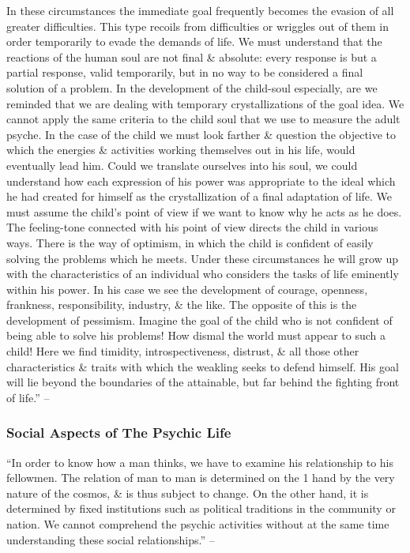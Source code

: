 \documentclass{article}
\begin{document}
In these circumstances the immediate goal frequently becomes the evasion of all greater difficulties. This type recoils from difficulties or wriggles out of them in order temporarily to evade the demands of life. We must understand that the reactions of the human soul are not final \& absolute: every response is but a partial response, valid temporarily, but in no way to be considered a final solution of a problem. In the development of the child-soul especially, are we reminded that we are dealing with temporary crystallizations of the goal idea. We cannot apply the same criteria to the child soul that we use to measure the adult psyche. In the case of the child we must look farther \& question the objective to which the energies \& activities working themselves out in his life, would eventually lead him. Could we translate ourselves into his soul, we could understand how each expression of his power was appropriate to the ideal which he had created for himself as the crystallization of a final adaptation of life. We must assume the child's point of view if we want to know why he acts as he does. The feeling-tone connected with his point of view directs the child in various ways. There is the way of optimism, in which the child is confident of easily solving the problems which he meets. Under these circumstances he will grow up with the characteristics of an individual who considers the tasks of life eminently within his power. In his case we see the development of courage, openness, frankness, responsibility, industry, \& the like. The opposite of this is the development of pessimism. Imagine the goal of the child who is not confident of being able to solve his problems! How dismal the world must appear to such a child! Here we find timidity, introspectiveness, distrust, \& all those other characteristics \& traits with which the weakling seeks to defend himself. His goal will lie beyond the boundaries of the attainable, but far behind the fighting front of life.'' -- \cite[pp. 19--25]{Adler_human_nature}

\subsubsection{Social Aspects of The Psychic Life}
``In order to know how a man thinks, we have to examine his relationship to his fellowmen. The relation of man to man is determined on the 1 hand by the very nature of the cosmos, \& is thus subject to change. On the other hand, it is determined by fixed institutions such as political traditions in the community or nation. We cannot comprehend the psychic activities without at the same time understanding these social relationships.'' -- \cite[p. 26]{Adler_human_nature}
\end{document}
